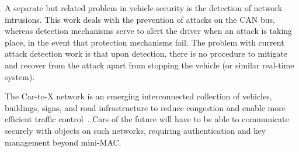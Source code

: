 A separate but related problem in vehicle security is the detection of network intrusions. This work deals with the prevention of attacks on the CAN bus, whereas detection mechanisms serve to alert the driver when an attack is taking place, in the event that protection mechanisms fail. The problem with current attack detection work is that upon detection, there is no procedure to mitigate and recover from the attack apart from stopping the vehicle (or similar real-time system).

The Car-to-X network is an emerging interconnected collection of vehicles, buildings, signs, and road infrastructure 
to reduce congestion and enable more efficient traffic control~\cite{C2X}. Cars of the future will have to be able to communicate
securely with objects on such networks, requiring authentication and key management beyond mini-MAC.

